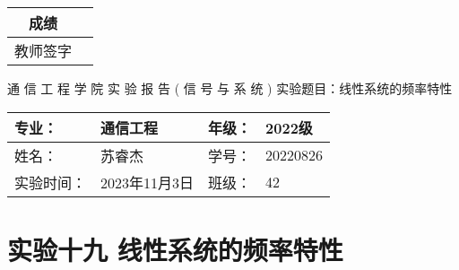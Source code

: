 \documentclass[dvipsnames, svgnames,a4paper,11pt]{article}
\begin{document}
\begin{table}
  \raggedleft
	\renewcommand\arraystretch{1.7}
	\begin{tabular}{|c|p{4em}|}
	\hline
	成绩 &  \\
	\hline
	教师签字 &   \\
	\hline
	\end{tabular}
\end{table}

\begin{center}
	{\kaishu \LARGE   \quad  \quad 通  \quad 信  \quad 工  \quad 程  \quad 学  \quad 院 }
  \newline
  \newline
  \newline
  \newline
  \newline
  {\kaishu \Huge 实 \quad  \quad  \quad 验  \quad  \quad  \quad 报 \quad  \quad  \quad 告}
  \newline
  \newline
  \newline
  \newline
  \newline
  {\songti \Huge  ( \quad  信  \quad 号  \quad 与  \quad 系  \quad 统 \quad)}
  \newline
  \newline
  \newline
  \newline
  \newline
  {\songti  \LARGE 实验题目：线性系统的频率特性  \quad  \quad \quad}
\end{center}



\begin{table}[b]
	\renewcommand\arraystretch{1.7}
	\begin{tabularx}{\textwidth}{|X|X|X|X|}
	\hline
	专业：& 通信工程 &年级：& 2022级\\
	\hline
	姓名：& 苏睿杰  & 学号：& 20220826\\
	\hline
	实验时间：& 2023年11月3日 & 班级：& 42 \\
	\hline
	\end{tabularx}
\end{table}



\clearpage
\setcounter{section}{0}
\section{实验十九 \quad 线性系统的频率特性}
	
\end{document}
